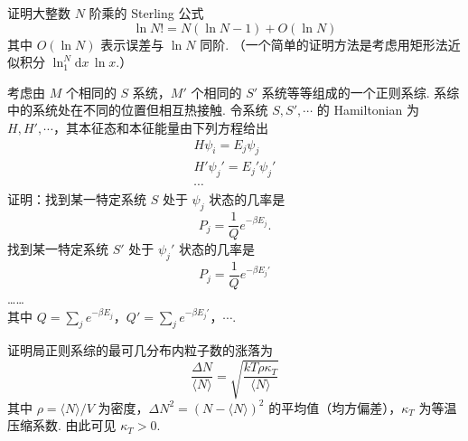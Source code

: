 \documentclass{assignment}
\begin{document}
\begin{prob}
    证明大整数 $N$ 阶乘的 Sterling 公式
    \[
        \ln N!=N(\ln N-1)+O(\ln N)
    \]
    其中 $O(\ln N)$ 表示误差与 $\ln N$ 同阶. （一个简单的证明方法是考虑用矩形法近似积分 $\ln_1^N\mathrm{d}x\,\ln x$.）
\end{prob}
\begin{pf}
    
\end{pf}

\begin{prob}
    考虑由 $M$ 个相同的 $S$ 系统，$M'$ 个相同的 $S'$ 系统等等组成的一个正则系综. 系综中的系统处在不同的位置但相互热接触. 令系统 $S,S',\cdots$ 的 Hamiltonian 为 $H,H',\cdots$，其本征态和本征能量由下列方程给出
    \begin{gather*}
        H\psi_i=E_j\psi_j\\
        H'\psi_j'=E_j'\psi_j'\\
        \cdots
    \end{gather*}
    证明：找到某一特定系统 $S$ 处于 $\psi_j$ 状态的几率是
    \[
        P_j=\frac{1}{Q}e^{-\beta E_j}.
    \]
    找到某一特定系统 $S'$ 处于 $\psi_j'$ 状态的几率是
    \[
        P_j=\frac{1}{Q}e^{-\beta E_j'}
    \]
    ……\\
    其中 $Q=\sum_je^{-\beta E_j}$，$Q'=\sum_je^{-\beta E_j'}$，$\cdots$.
\end{prob}
\begin{pf}

\end{pf}

\begin{prob}
    证明局正则系综的最可几分布内粒子数的涨落为
    \[
        \frac{\Delta N}{\langle N\rangle}=\sqrt{\frac{kT\rho\kappa_T}{\langle N\rangle}}
    \]
    其中 $\rho=\langle N\rangle/V$ 为密度，$\Delta N^2=(N-\langle N\rangle)^2$ 的平均值（均方偏差），$\kappa_T$ 为等温压缩系数. 由此可见 $\kappa_T>0$.
\end{prob}
\begin{pf}
    
\end{pf}
\end{document}

